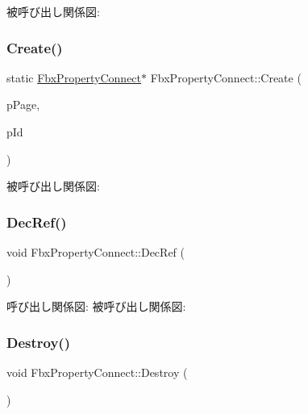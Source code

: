 被呼び出し関係図\+:
\mbox{\label{class_fbx_property_connect_aa9dc912c6e7b5185f0afa7af81c55e85}} 
\subsubsection{\texorpdfstring{Create()}{Create()}}
{\footnotesize\ttfamily static \hyperlink{class_fbx_property_connect}{Fbx\+Property\+Connect}$\ast$ Fbx\+Property\+Connect\+::\+Create (\begin{DoxyParamCaption}\item[{\hyperlink{class_fbx_property_page}{Fbx\+Property\+Page} $\ast$}]{p\+Page,  }\item[{\hyperlink{fbxtypes_8h_a088fa96de3b0b3ea69f0f6afef525dfb}{Fbx\+Int}}]{p\+Id }\end{DoxyParamCaption})\hspace{0.3cm}{\ttfamily [static]}}

被呼び出し関係図\+:
\mbox{\label{class_fbx_property_connect_a2396c6fe707bc6f2f44cc70fdbe44761}} 
\subsubsection{\texorpdfstring{Dec\+Ref()}{DecRef()}}
{\footnotesize\ttfamily void Fbx\+Property\+Connect\+::\+Dec\+Ref (\begin{DoxyParamCaption}{ }\end{DoxyParamCaption})}

呼び出し関係図\+:
被呼び出し関係図\+:
\mbox{\label{class_fbx_property_connect_aed862bff6fa1cfb39b7f76cd52d4b8a1}} 
\subsubsection{\texorpdfstring{Destroy()}{Destroy()}}
{\footnotesize\ttfamily void Fbx\+Property\+Connect\+::\+Destroy (\begin{DoxyParamCaption}{ }\end{DoxyParamCaption})}

